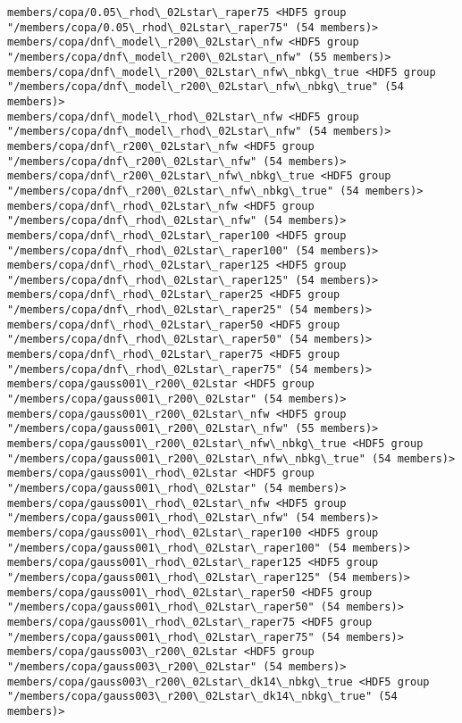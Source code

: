 \documentclass[11pt]{article}
\begin{document}
\begin{Verbatim}[commandchars=\\\{\}]
members/copa/0.05\_rhod\_02Lstar\_raper75 <HDF5 group "/members/copa/0.05\_rhod\_02Lstar\_raper75" (54 members)>
members/copa/dnf\_model\_r200\_02Lstar\_nfw <HDF5 group "/members/copa/dnf\_model\_r200\_02Lstar\_nfw" (55 members)>
members/copa/dnf\_model\_r200\_02Lstar\_nfw\_nbkg\_true <HDF5 group "/members/copa/dnf\_model\_r200\_02Lstar\_nfw\_nbkg\_true" (54 members)>
members/copa/dnf\_model\_rhod\_02Lstar\_nfw <HDF5 group "/members/copa/dnf\_model\_rhod\_02Lstar\_nfw" (54 members)>
members/copa/dnf\_r200\_02Lstar\_nfw <HDF5 group "/members/copa/dnf\_r200\_02Lstar\_nfw" (54 members)>
members/copa/dnf\_r200\_02Lstar\_nfw\_nbkg\_true <HDF5 group "/members/copa/dnf\_r200\_02Lstar\_nfw\_nbkg\_true" (54 members)>
members/copa/dnf\_rhod\_02Lstar\_nfw <HDF5 group "/members/copa/dnf\_rhod\_02Lstar\_nfw" (54 members)>
members/copa/dnf\_rhod\_02Lstar\_raper100 <HDF5 group "/members/copa/dnf\_rhod\_02Lstar\_raper100" (54 members)>
members/copa/dnf\_rhod\_02Lstar\_raper125 <HDF5 group "/members/copa/dnf\_rhod\_02Lstar\_raper125" (54 members)>
members/copa/dnf\_rhod\_02Lstar\_raper25 <HDF5 group "/members/copa/dnf\_rhod\_02Lstar\_raper25" (54 members)>
members/copa/dnf\_rhod\_02Lstar\_raper50 <HDF5 group "/members/copa/dnf\_rhod\_02Lstar\_raper50" (54 members)>
members/copa/dnf\_rhod\_02Lstar\_raper75 <HDF5 group "/members/copa/dnf\_rhod\_02Lstar\_raper75" (54 members)>
members/copa/gauss001\_r200\_02Lstar <HDF5 group "/members/copa/gauss001\_r200\_02Lstar" (54 members)>
members/copa/gauss001\_r200\_02Lstar\_nfw <HDF5 group "/members/copa/gauss001\_r200\_02Lstar\_nfw" (55 members)>
members/copa/gauss001\_r200\_02Lstar\_nfw\_nbkg\_true <HDF5 group "/members/copa/gauss001\_r200\_02Lstar\_nfw\_nbkg\_true" (54 members)>
members/copa/gauss001\_rhod\_02Lstar <HDF5 group "/members/copa/gauss001\_rhod\_02Lstar" (54 members)>
members/copa/gauss001\_rhod\_02Lstar\_nfw <HDF5 group "/members/copa/gauss001\_rhod\_02Lstar\_nfw" (54 members)>
members/copa/gauss001\_rhod\_02Lstar\_raper100 <HDF5 group "/members/copa/gauss001\_rhod\_02Lstar\_raper100" (54 members)>
members/copa/gauss001\_rhod\_02Lstar\_raper125 <HDF5 group "/members/copa/gauss001\_rhod\_02Lstar\_raper125" (54 members)>
members/copa/gauss001\_rhod\_02Lstar\_raper50 <HDF5 group "/members/copa/gauss001\_rhod\_02Lstar\_raper50" (54 members)>
members/copa/gauss001\_rhod\_02Lstar\_raper75 <HDF5 group "/members/copa/gauss001\_rhod\_02Lstar\_raper75" (54 members)>
members/copa/gauss003\_r200\_02Lstar <HDF5 group "/members/copa/gauss003\_r200\_02Lstar" (54 members)>
members/copa/gauss003\_r200\_02Lstar\_dk14\_nbkg\_true <HDF5 group "/members/copa/gauss003\_r200\_02Lstar\_dk14\_nbkg\_true" (54 members)>

\end{Verbatim}
\end{document}
